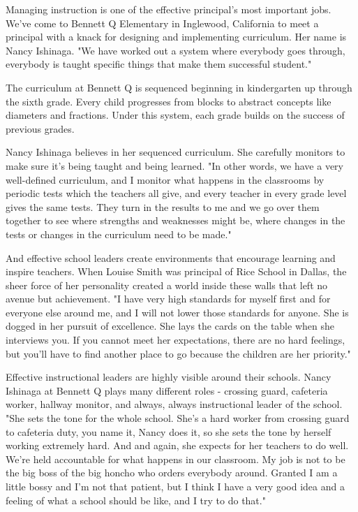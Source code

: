 Managing instruction is one of the effective principal's most important jobs.
We've come to Bennett Q Elementary in Inglewood, California to meet a principal with a knack for designing and implementing curriculum.
Her name is Nancy Ishinaga.
"We have worked out a system where everybody goes through, everybody is taught specific things that make them successful student."

The curriculum at Bennett Q is sequenced beginning in kindergarten up through the sixth grade.
Every child progresses from blocks to abstract concepts like diameters and fractions.
Under this system, each grade builds on the success of previous grades.

Nancy Ishinaga believes in her sequenced curriculum.
She carefully monitors to make sure it's being taught and being learned.
"In other words, we have a very well-defined curriculum, and I monitor what happens in the classrooms by periodic tests which the teachers all give, and every teacher in every grade level gives the same tests.
They turn in the results to me and we go over them together to see where strengths and weaknesses might be, where changes in the tests or changes in the curriculum need to be made."

And effective school leaders create environments that encourage learning and inspire teachers.
When Louise Smith was principal of Rice School in Dallas, the sheer force of her personality created a world inside these walls that left no avenue but achievement.
"I have very high standards for myself first and for everyone else around me, and I will not lower those standards for anyone.
She is dogged in her pursuit of excellence.
She lays the cards on the table when she interviews you.
If you cannot meet her expectations, there are no hard feelings, but you'll have to find another place to go because the children are her priority."

Effective instructional leaders are highly visible around their schools.
Nancy Ishinaga at Bennett Q plays many different roles - crossing guard, cafeteria worker, hallway monitor, and always, always instructional leader of the school.
"She sets the tone for the whole school.
She's a hard worker from crossing guard to cafeteria duty, you name it, Nancy does it, so she sets the tone by herself working extremely hard.
And and again, she expects for her teachers to do well.
We're held accountable for what happens in our classroom.
My job is not to be the big boss of the big honcho who orders everybody around.
Granted I am a little bossy and I'm not that patient, but I think I have a very good idea and a feeling of what a school should be like, and I try to do that."

